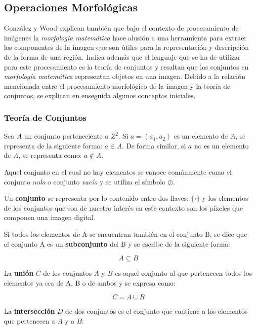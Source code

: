 \subsection{Operaciones Morfológicas}

González y Wood explican también que bajo el contexto de procesamiento de imágenes la \textit{morfología matemática} hace alusión a una herramienta para extraer los componentes de la imagen que son útiles para la representación y descripción de la forma de una región. Indica además que el lenguaje que se ha de utilizar para este procesamiento es la teoría de conjuntos y resaltan que los conjuntos en \textit{morfología matemática} representan objetos en una imagen.
Debido a la relación mencionada entre el procesamiento morfológico de la imagen y la teoría de conjuntos, se explican en enseguida algunos conceptos iniciales.

\subsubsection{Teoría de Conjuntos}
Sea $A$ un conjunto perteneciente a $Z^2$. Si $a = (a_{1}, a_{2})$ es un elemento de $A$, se representa de la siguiente forma: $a \in A$. De forma similar, si $a$ no es un elemento de $A$, se representa como: $a\notin A$.

Aquel conjunto en el cual no hay elementos se conoce comúnmente como el conjunto \textit{nulo} o conjunto \textit{vacío} y se utiliza el símbolo $\oslash$.

Un \textbf{conjunto} se representa por lo contenido entre dos llaves: $\{\cdot\}$ y los elementos de los conjuntos que son de nuestro interés en este contexto son los píxeles que componen una imagen digital.

Si todos los elementos de A se encuentran también en el conjunto B, se dice que el conjunto A es un \textbf{subconjunto} del B y se escribe de la siguiente forma:

\begin{equation}
A\subseteq B
\label{eqn:subconjunto}
\end{equation}

La \textbf{unión} $C$ de los conjuntos $A$ y $B$ es aquel conjunto al que pertenecen todos los elementos ya sea de A, B o de ambos y se expresa como:

\begin{equation}
C = A \cup B
\label{eqn:union}
\end{equation}

La \textbf{intersección} $D$ de dos conjuntos es el conjunto que contiene a los elementos que pertenecen a $A$ y a $B$:

